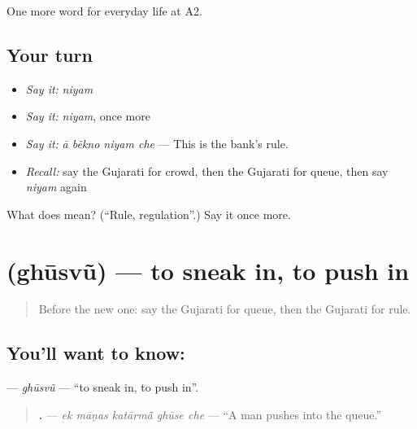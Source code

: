 \begin{grammarlens}[title={What you've built}]
One more word for everyday life at A2.
\end{grammarlens}

\subsection*{Your turn}
\begin{itemize}
\raggedright
  \item \emph{Say it:} \emph{niyam}
  \item \emph{Say it:} \emph{niyam}, once more
  \item \emph{Say it:} \emph{ā bẽkno niyam che} — This is the bank's rule.
  \item \emph{Recall:} say the Gujarati for crowd, then the Gujarati for queue, then say \emph{niyam} again
\end{itemize}

\begin{tcolorbox}[breakable,colback=teal!4,colframe=teal!35!black,title={Before you move on}]
What does  mean? (\textquotedblleft{}Rule, regulation\textquotedblright{}.) Say it once more.
\end{tcolorbox}
\section[\texorpdfstring{\gu{ઘૂસવું} (ghūsvũ)}{ઘૂસવું (ghūsvũ)}]{ (ghūsvũ) — to sneak in, to push in}

\label{lesson:GU-C199-ghusvu}



\begin{quote}
Before the new one: say the Gujarati for queue, then the Gujarati for rule.
\end{quote}

\subsection*{You'll want to know: }
\textbf{} — \emph{ghūsvũ} — \textquotedblleft{}to sneak in, to push in\textquotedblright{}.

\begin{quote}
\textbf{    .} — \emph{ek māṇas katārmā̃ ghūse che} — \textquotedblleft{}A man pushes into the queue.\textquotedblright{}
\end{quote}

